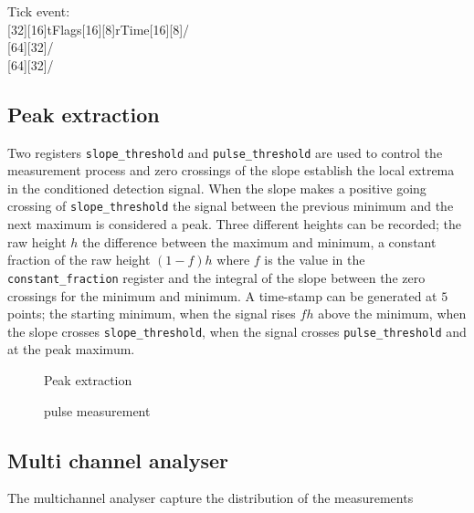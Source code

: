 \documentclass{article}
\newcommand{\code}[1]{\texttt{#1}}
\begin{document}
\clearpage

Tick event:\\
[32][16]{tFlags}[16][8]{rTime}[16][8]/
\\
[64][32]/
\\
[64][32]/
  
\subsection{Peak extraction}
Two registers \code{slope\_threshold} and \code{pulse\_threshold} are used to
control the measurement process and zero crossings of the slope establish the
local extrema in the conditioned detection signal.
When the slope makes a positive going crossing of \code{slope\_threshold} the
signal between the previous minimum and the next maximum is
considered a peak. Three different heights can be recorded; the raw height $h$
the difference between the maximum and minimum, a constant fraction of the raw
height $(1-f)h$ where $f$ is the value in the \code{constant\_fraction}
register and the integral of the slope between the zero crossings for the
minimum and minimum. A time-stamp can be generated at $5$ points; the starting
minimum, when the signal rises $fh$ above the minimum, when the slope crosses
\code{slope\_threshold}, when the signal crosses \code{pulse\_threshold} and at
the peak maximum.

\begin{figure}[!hpbt]
  \centering
  
  \caption{
    Peak extraction
  }
  \label{fig:peakextraction}
\end{figure}


\begin{figure}[!hpbt]
  \centering
  
  \caption{
    pulse measurement
  }
  \label{fig:pulsemeasurement}
\end{figure}

\begin{figure}[!hpbt]
  \centering 
  
\end{figure}

\clearpage

\subsection{Multi channel analyser}
The multichannel analyser capture the distribution of the measurements
\end{document}
